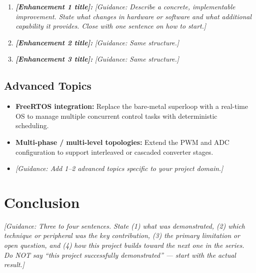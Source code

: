 \begin{enumerate}
    \item \textbf{\textit{[Enhancement 1 title]:}}
          \textit{[Guidance: Describe a concrete, implementable
          improvement. State what changes in hardware or software
          and what additional capability it provides. Close with
          one sentence on how to start.]}

    \item \textbf{\textit{[Enhancement 2 title]:}}
          \textit{[Guidance: Same structure.]}

    \item \textbf{\textit{[Enhancement 3 title]:}}
          \textit{[Guidance: Same structure.]}
\end{enumerate}

\subsection{Advanced Topics}

\begin{itemize}
    \item \textbf{FreeRTOS integration:} Replace the bare-metal
          superloop with a real-time OS to manage multiple
          concurrent control tasks with deterministic scheduling.
    \item \textbf{Multi-phase / multi-level topologies:} Extend the
          PWM and ADC configuration to support interleaved or
          cascaded converter stages.
    \item \textit{[Guidance: Add 1--2 advanced topics specific to
          your project domain.]}
\end{itemize}

\section{Conclusion}

\textit{[Guidance: Three to four sentences. State (1) what was
demonstrated, (2) which technique or peripheral was the key
contribution, (3) the primary limitation or open question, and
(4) how this project builds toward the next one in the series.
Do NOT say ``this project successfully demonstrated'' --- start
with the actual result.]}

